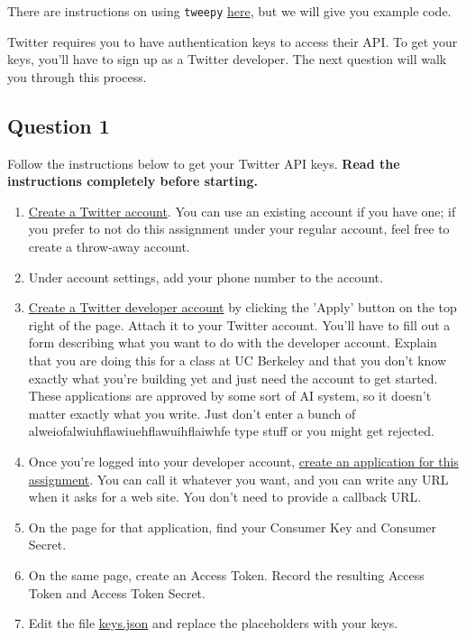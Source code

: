 \documentclass[11pt]{article}
\providecommand{\tightlist}{%
      \setlength{\itemsep}{0pt}\setlength{\parskip}{0pt}}
\begin{document}
    There are instructions on using \texttt{tweepy}
\href{http://tweepy.readthedocs.io/en/v3.5.0/getting_started.html}{here},
but we will give you example code.

Twitter requires you to have authentication keys to access their API. To
get your keys, you'll have to sign up as a Twitter developer. The next
question will walk you through this process.

    \subsection{Question 1}\label{question-1}

Follow the instructions below to get your Twitter API keys. \textbf{Read
the instructions completely before starting.}

\begin{enumerate}
\def\labelenumi{\arabic{enumi}.}
\tightlist
\item
  \href{https://twitter.com}{Create a Twitter account}. You can use an
  existing account if you have one; if you prefer to not do this
  assignment under your regular account, feel free to create a
  throw-away account.
\item
  Under account settings, add your phone number to the account.
\item
  \href{https://dev.twitter.com/resources/signup}{Create a Twitter
  developer account} by clicking the 'Apply' button on the top right of
  the page. Attach it to your Twitter account. You'll have to fill out a
  form describing what you want to do with the developer account.
  Explain that you are doing this for a class at UC Berkeley and that
  you don't know exactly what you're building yet and just need the
  account to get started. These applications are approved by some sort
  of AI system, so it doesn't matter exactly what you write. Just don't
  enter a bunch of alweiofalwiuhflawiuehflawuihflaiwhfe type stuff or
  you might get rejected.
\item
  Once you're logged into your developer account,
  \href{https://apps.twitter.com/app/new}{create an application for this
  assignment}. You can call it whatever you want, and you can write any
  URL when it asks for a web site. You don't need to provide a callback
  URL.
\item
  On the page for that application, find your Consumer Key and Consumer
  Secret.
\item
  On the same page, create an Access Token. Record the resulting Access
  Token and Access Token Secret.
\item
  Edit the file \url{keys.json} and replace the placeholders with your
  keys.
\end{enumerate}
\end{document}
